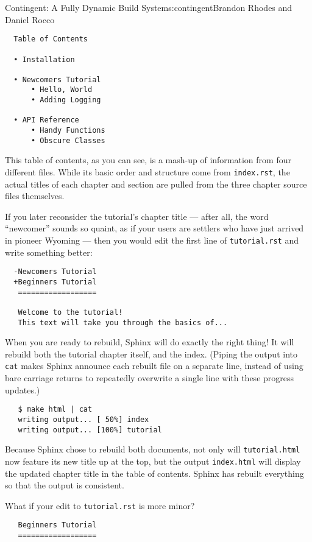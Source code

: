 \begin{aosachapter}{Contingent: A Fully Dynamic Build System}{s:contingent}{Brandon Rhodes and Daniel Rocco}
\begin{verbatim}
  Table of Contents

  • Installation

  • Newcomers Tutorial
      • Hello, World
      • Adding Logging

  • API Reference
      • Handy Functions
      • Obscure Classes
\end{verbatim}

This table of contents, as you can see, is a mash-up of information from
four different files. While its basic order and structure come from
\texttt{index.rst}, the actual titles of each chapter and section are
pulled from the three chapter source files themselves.

If you later reconsider the tutorial's chapter title --- after all, the
word ``newcomer'' sounds so quaint, as if your users are settlers who
have just arrived in pioneer Wyoming --- then you would edit the first
line of \texttt{tutorial.rst} and write something better:

\begin{verbatim}
  -Newcomers Tutorial
  +Beginners Tutorial
   ==================

   Welcome to the tutorial!
   This text will take you through the basics of...
\end{verbatim}

When you are ready to rebuild, Sphinx will do exactly the right thing!
It will rebuild both the tutorial chapter itself, and the index. (Piping
the output into \texttt{cat} makes Sphinx announce each rebuilt file on
a separate line, instead of using bare carriage returns to repeatedly
overwrite a single line with these progress updates.)

\begin{verbatim}
   $ make html | cat
   writing output... [ 50%] index
   writing output... [100%] tutorial
\end{verbatim}

Because Sphinx chose to rebuild both documents, not only will
\texttt{tutorial.html} now feature its new title up at the top, but the
output \texttt{index.html} will display the updated chapter title in the
table of contents. Sphinx has rebuilt everything so that the output is
consistent.

What if your edit to \texttt{tutorial.rst} is more minor?

\begin{verbatim}
   Beginners Tutorial
   ==================


\end{verbatim}
\end{aosachapter}
